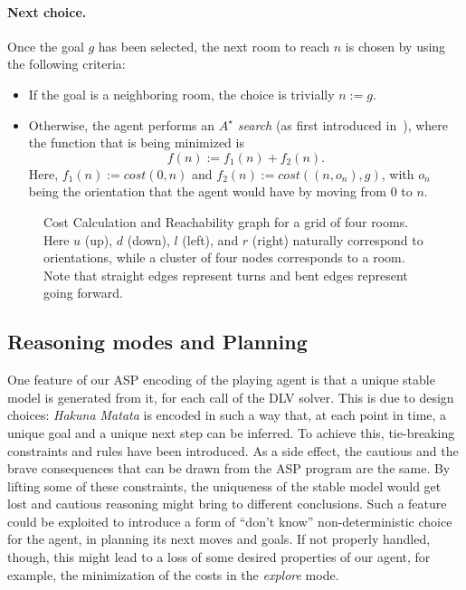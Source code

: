 \documentclass{llncs}
\newcommand{\hm}{\emph{Hakuna Matata}\xspace}
\begin{document}
\paragraph{Next choice.} Once the goal $g$ has been selected, the next room to reach $n$ is chosen by using the following criteria:
\begin{itemize}
	\item If the goal is a neighboring room, the choice is trivially $n := g$.
	\item Otherwise, the agent performs an \emph{$A^{\star}$ search} (as first introduced in~\cite{AStar}), where the function that is being minimized is
	$$
	f(n) := f_1(n) + f_2(n).
	$$
	Here, $f_1(n) := cost(0,n)$ and $f_2(n) := cost((n,o_n),g)$, with $o_n$ being the orientation that the agent would have by moving from $0$ to $n$.
\end{itemize}

\begin{figure}
	\begin{center}
		
	\end{center}
	\caption[Cost Calculation and Reachability graph]{Cost Calculation and Reachability graph for a grid of four rooms. Here $u$ (up), $d$ (down), $l$ (left), and $r$ (right) naturally correspond to orientations, while a cluster of four nodes corresponds to a room. Note that straight edges represent turns and bent edges represent going forward.}
	\label{fig:graph}
\end{figure}

\subsection{Reasoning modes and Planning}

One feature of our ASP encoding of the playing agent is that a unique stable model is generated from it, for each call of the DLV solver.
This is due to design choices: \hm is encoded in such a way that, at each point in time, a unique goal and a unique next step can be inferred.
To achieve this, tie-breaking constraints and rules have been introduced.
As a side effect, the cautious and the brave consequences that can be drawn from the ASP program are the same.
By lifting some of these constraints, the uniqueness of the stable model would get lost and cautious reasoning might bring to different conclusions.
Such a feature could be exploited to introduce a form of ``don't know'' non-deterministic choice for the agent, in planning its next moves and goals.
If not properly handled, though, this might lead to a loss of some desired properties of our agent, for example, the minimization of the costs in the \emph{explore} mode.
\end{document}
